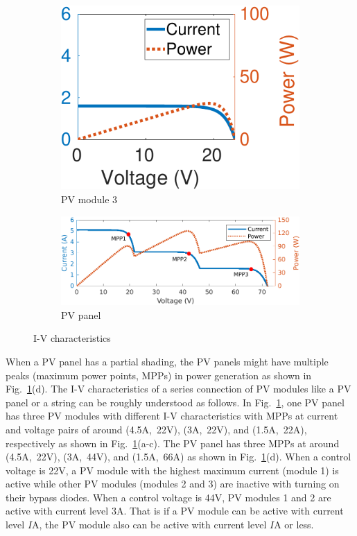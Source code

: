 \documentclass[conference]{IEEEtran}
\begin{document}
\begin{figure}[t]
\begin{subfigure}[b]{0.3\linewidth}
        \includegraphics[width=\linewidth]{fig/m_3.png}
        \caption{PV module 3}
     \end{subfigure}
    \hfill
    \begin{subfigure}[b]{\linewidth}
        \centering
        \vspace{2mm}
        \includegraphics[width=0.85\linewidth]{fig/panel.png}
        \caption{PV panel}
    \end{subfigure}
    \caption{I-V characteristics}
    \label{fig:IV}
\end{figure}

When a PV panel has a partial shading, the PV panels might have multiple peaks (maximum power points, MPPs) in power generation as shown in Fig.~\ref{fig:IV}(d). 
The I-V characteristics of a series connection of PV modules like a PV panel or a string can be roughly understood as follows. 
In Fig.~\ref{fig:IV}, one PV panel has three PV modules with different I-V characteristics with MPPs at current and voltage pairs of around (4.5A,~22V), (3A,~22V), and (1.5A,~22A), respectively as shown in Fig.~\ref{fig:IV}(a-c). The PV panel has three MPPs at around (4.5A,~22V), (3A,~44V), and (1.5A,~66A) as shown in Fig.~\ref{fig:IV}(d). 
When a control voltage is 22V, a PV module with the highest maximum current (module 1) is active while other PV modules (modules 2 and 3) are inactive with turning on their bypass diodes. 
When a control voltage is 44V, PV modules 1 and 2 are active with current level 3A. That is if a PV module can be active with current level $I$A, the PV module also can be active with current level $I$A or less.
\end{document}
